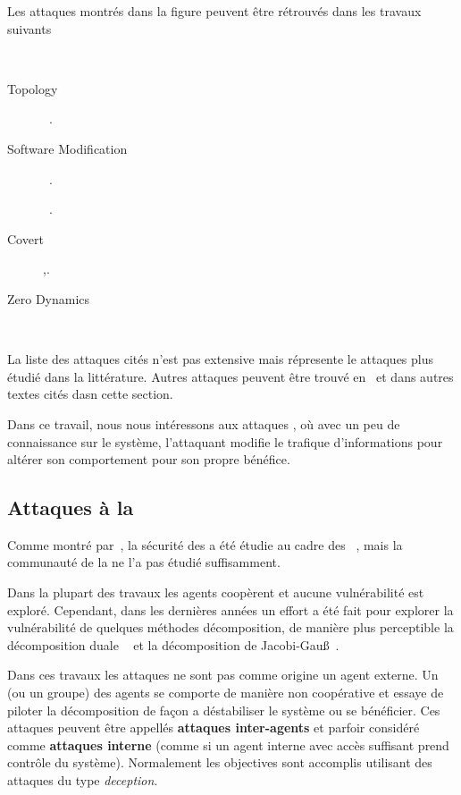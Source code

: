 \documentclass[../main.tex]{subfiles}
\begin{document}
Les attaques montrés dans la figure peuvent être rétrouvés dans les travaux suivants
\begin{description}
\item[\DoS{}]~\cite{SunYang2019,ZhaoEtAl2020,YangEtAl2019}
\item[Topology]~\cite{KimTong2013,WuEtAl2016,ZhangEtAl2021b}.
\item[Software Modification]~\cite{Langner2011}.
\item[\fdi{}]~\cite{PasqualettiEtAl2013}.
\item[Covert],\cite{Smith2015,HoehnZhang2016,BarboniEtAl2020}.
\item[Zero Dynamics]~\cite{TeixeiraEtAl2012,TeixeiraEtAl2015,HoehnZhang2016}
\end{description}

La liste des attaques cités n'est pas extensive mais répresente le attaques plus étudié dans la littérature.
Autres attaques peuvent être trouvé en~\cite{TeixeiraEtAl2015,ZhangEtAl2021b} et dans autres textes cités dasn cette section.

Dans ce travail, nous nous intéressons aux attaques \fdi{}, où avec un peu de connaissance sur le système, l'attaquant modifie le trafique d'informations pour altérer son comportement pour son propre bénéfice.

\subsection{Attaques à la \dmpc{}}\label{sec:attacks_in_dmpc_fr}

Comme montré par~\cite{ArauzEtAl2021}, la sécurité des \cps{} a été étudie au cadre des \mpc{}~\cite{SunYang2019,FranzeEtAl2022}, mais la communauté de la \dmpc{} ne l'a pas étudié suffisamment.

Dans la plupart des travaux les agents coopèrent et aucune vulnérabilité est exploré.
Cependant, dans les dernières années un effort a été fait pour explorer la vulnérabilité de quelques méthodes décomposition, de manière plus perceptible la décomposition duale ~\cite{VelardeEtAl2017b,VelardeEtAl2017a,VelardeEtAl2018,AnandutaEtAl2018,AnandutaEtAl2019,AnandutaEtAl2020} et la décomposition de Jacobi-Gauß~\cite{ChanfreutEtAl2018}.

Dans ces travaux les attaques ne sont pas comme origine un agent externe.
Un (ou un groupe) des agents se comporte de manière non coopérative et essaye de piloter la décomposition de façon a déstabiliser le système ou se bénéficier.
Ces attaques peuvent être appellés \textbf{attaques inter-agents} et parfoir considéré comme \textbf{attaques interne} (comme si un agent interne avec accès suffisant prend contrôle du système).
Normalement les objectives sont accomplis utilisant des attaques du type \emph{deception}.
\end{document}
